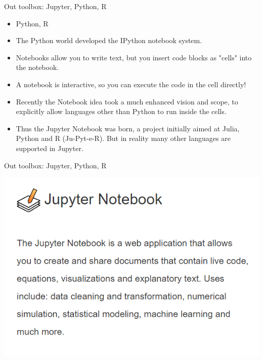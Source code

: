 \documentclass[11pt]{beamer}
\begin{document}
\begin{frame}{Out toolbox: Jupyter, Python, R}
\begin{itemize}
\item Python, R
\item The Python world developed the IPython notebook system. 
\item Notebooks  allow you to write text, but you insert code blocks as "cells" into the notebook. 
\item A notebook is interactive, so you can execute the code in the cell directly!
\item Recently the Notebook idea took a much enhanced vision and scope, to explicitly allow languages other than Python to run inside the cells. 
\item Thus the Jupyter Notebook was born, a project initially aimed at Julia, Python and R (Ju-Pyt-e-R). But in reality many other languages are supported in Jupyter.
\end{itemize}
\end{frame}
\begin{frame}{Out toolbox: Jupyter, Python, R}
\begin{center}
\includegraphics[scale=.6]{img/jupyter_1.PNG} 
\end{center}
\end{frame}
\end{document}
